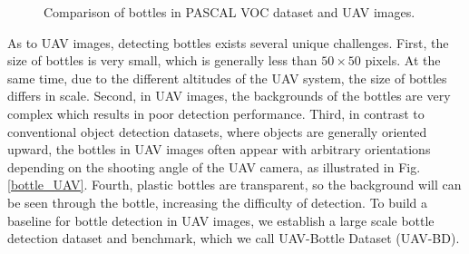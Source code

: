 \begin{figure}
	\centering
	
	\caption{Comparison of bottles in PASCAL VOC dataset and UAV images.}
	\label{bottle_VOC_UAV}
\end{figure}


As to UAV images, detecting bottles exists several unique challenges. First, the size of bottles is very small, which is generally less than $ 50\times 50 $ pixels. At the same time, due to the different altitudes of the UAV system, the size of bottles differs in scale. Second, in UAV images, the backgrounds of the bottles are very complex which results in poor detection performance. Third, in contrast to conventional object detection datasets, where objects are generally oriented upward\cite{DOTA}, the bottles in UAV images often appear with arbitrary orientations depending on the shooting angle of the UAV camera, as illustrated in Fig.\ref{bottle_UAV}. Fourth, plastic bottles are transparent, so the background will can be seen through the bottle, increasing the difficulty of detection. To build a baseline for bottle detection in UAV images, we establish a large scale bottle detection dataset and benchmark, which we call UAV-Bottle Dataset (UAV-BD).

